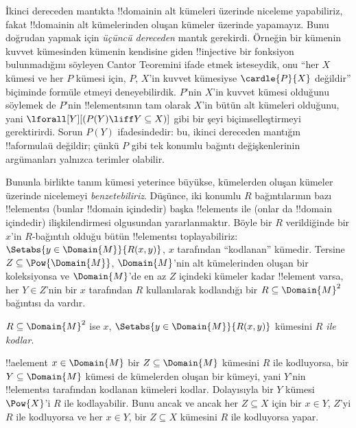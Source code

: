 



\begin{explain}
İkinci dereceden mantıkta !!{domain}{}in alt kümeleri üzerinde niceleme
yapabiliriz, fakat !!{domain}{}in alt kümelerinden oluşan kümeler üzerinde
yapamayız. Bunu doğrudan yapmak için \emph{üçüncü dereceden} mantık
gerekirdi. Örneğin bir kümenin kuvvet kümesinden kümenin kendisine giden
!!{injective} bir fonksiyon bulunmadığını söyleyen Cantor Teoremini ifade etmek
isteseydik, onu ``her $X$ kümesi ve her $P$ kümesi için, $P$, $X$'in kuvvet
kümesiyse $\cardle{P}{X}$ değildir'' biçiminde formüle etmeyi deneyebilirdik.
$P$'nin $X$'in kuvvet kümesi olduğunu söylemek de $P$'nin !!{element}s{}ının
tam olarak $X$'in bütün alt kümeleri olduğunu, yani
$\lforall[Y][(P(Y)\liff Y\subseteq X)]$ gibi bir şeyi biçimselleştirmeyi
gerektirirdi. Sorun $P(Y)$ ifadesindedir: bu, ikinci dereceden mantığın
!!a{formula}{}ü değildir; çünkü $P$ gibi tek konumlu bağıntı değişkenlerinin
argümanları yalnızca terimler olabilir.

Bununla birlikte tanım kümesi yeterince büyükse, kümelerden oluşan kümeler
üzerinde nicelemeyi \emph{benzetebiliriz}. Düşünce, iki konumlu $R$
bağıntılarının bazı !!{element}s{}ı (bunlar !!{domain} içindedir) başka
!!{element}s ile (onlar da !!{domain} içindedir) ilişkilendirmesi olgusundan
yararlanmaktır. Böyle bir $R$ verildiğinde bir $x$'in $R$-bağıntılı olduğu
bütün !!{element}s{}ı toplayabiliriz:
$\Setabs{y\in\Domain{M}}{R(x,y)}$, $x$ tarafından ``kodlanan'' kümedir.
Tersine $Z\subseteq\Pow{\Domain{M}}$, $\Domain{M}$'nin alt kümelerinden oluşan
bir koleksiyonsa ve $\Domain{M}$'de en az $Z$ içindeki kümeler kadar
!!{element} varsa, her $Y\in Z$'nin bir $x$ tarafından $R$ kullanılarak
kodlandığı bir $R\subseteq\Domain{M}^2$ bağıntısı da vardır.
\end{explain}

\begin{defn}
$R\subseteq\Domain{M}^2$ ise $x$, $\Setabs{y\in\Domain{M}}{R(x,y)}$ kümesini
\emph{$R$ ile kodlar}.
\end{defn}

!!a{element} $x\in\Domain{M}$ bir $Z\subseteq\Domain{M}$ kümesini $R$ ile
kodluyorsa, bir $Y\subseteq\Domain{M}$ kümesi de kümelerden oluşan bir
kümeyi, yani $Y$'nin !!{element}s{}ı tarafından kodlanan kümeleri kodlar.
Dolayısıyla bir $Y$ kümesi $\Pow{X}$'i $R$ ile kodlayabilir. Bunu ancak ve
ancak her $Z\subseteq X$ için bir $x\in Y$, $Z$'yi $R$ ile kodluyorsa ve her
$x\in Y$, bir $Z\subseteq X$ kümesini $R$ ile kodluyorsa yapar.

